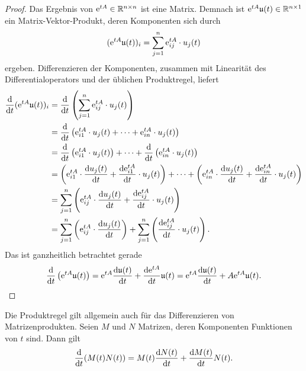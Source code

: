 \begin{proof}
    Das Ergebnis von $\mathrm{e}^{t A} \in \mathbb{R}^{n \times n}$ ist eine Matrix.
    Demnach ist $\mathrm{e}^{t A} \mathfrak{u}(t) \in \mathbb{R}^{n \times 1}$ ein Matrix-Vektor-Produkt, deren Komponenten sich durch
    \begin{equation*}
        (\mathrm{e}^{t A} \mathfrak{u}(t))_i = \sum^n_{j=1} \mathrm{e}^{t A}_{ij} \cdot u_j(t)
    \end{equation*}
    ergeben.
    Differenzieren der Komponenten, zusammen mit Linearität des Differentialoperators und der üblichen Produktregel, liefert
    \begin{align*}
        \frac{\mathrm{d} }{\mathrm{d} t}(\mathrm{e}^{t A} \mathfrak{u}(t))_i
        &= \frac{\mathrm{d} }{\mathrm{d} t} \left( \sum^n_{j=1} \mathrm{e}^{t A}_{ij} \cdot u_j(t) \right)\\
        &= \frac{\mathrm{d} }{\mathrm{d} t} \left( \mathrm{e}^{t A}_{i1} \cdot u_j(t) + \dots + \mathrm{e}^{t A}_{in} \cdot u_j(t) \right)\\
        &=  \frac{\mathrm{d} }{\mathrm{d} t} \left( \mathrm{e}^{t A}_{i1} \cdot u_j(t) \right) + \dots + \frac{\mathrm{d} }{\mathrm{d} t} \left( \mathrm{e}^{t A}_{in} \cdot u_j(t) \right)\\
        &=  \left( \mathrm{e}^{t A}_{i1} \cdot \frac{\mathrm{d} u_j(t)}{\mathrm{d} t} + \frac{\mathrm{d} \mathrm{e}^{t A}_{i1}}{\mathrm{d} t} \cdot u_j(t) \right)
            + \dots + \left( \mathrm{e}^{t A}_{in} \cdot \frac{\mathrm{d} u_j(t)}{\mathrm{d} t} + \frac{\mathrm{d} \mathrm{e}^{t A}_{in}}{\mathrm{d} t} \cdot u_j(t) \right)\\
        &= \sum^n_{j=1} \left( \mathrm{e}^{t A}_{ij} \cdot \frac{\mathrm{d} u_j(t)}{\mathrm{d} t} + \frac{\mathrm{d} \mathrm{e}^{t A}_{ij}}{\mathrm{d} t} \cdot u_j(t) \right)\\
        &= \sum^n_{j=1} \left( \mathrm{e}^{t A}_{ij} \cdot \frac{\mathrm{d} u_j(t)}{\mathrm{d} t} \right)
            +  \sum^n_{j=1} \left( \frac{\mathrm{d} \mathrm{e}^{t A}_{ij}}{\mathrm{d} t} \cdot u_j(t) \right).
    \end{align*}
    Das ist ganzheitlich betrachtet gerade
    \begin{equation*}
        \frac{\mathrm{d} }{\mathrm{d} t} \left( \mathrm{e}^{t A} \mathfrak{u}(t) \right) = \mathrm{e}^{t A} \frac{\mathrm{d} \mathfrak{u}(t)}{\mathrm{d} t} + \frac{\mathrm{d} \mathrm{e}^{t A}}{\mathrm{d} t} \mathfrak{u}(t)
        = \mathrm{e}^{t A} \frac{\mathrm{d} \mathfrak{u}(t)}{\mathrm{d} t} + A \mathrm{e}^{t A} \mathfrak{u}(t).
    \end{equation*}
\end{proof}

\begin{remark*}
    Die Produktregel gilt allgemein auch für das Differenzieren von Matrizenprodukten.
    Seien $M$ und $N$ Matrizen, deren Komponenten Funktionen von $t$ sind.
    Dann gilt
    \begin{equation*}
        \frac{\mathrm{d} }{\mathrm{d} t}(M(t) N(t)) = M(t) \frac{\mathrm{d} N(t)}{\mathrm{d} t} + \frac{\mathrm{d} M(t)}{\mathrm{d} t} N(t).
    \end{equation*}
\end{remark*}

